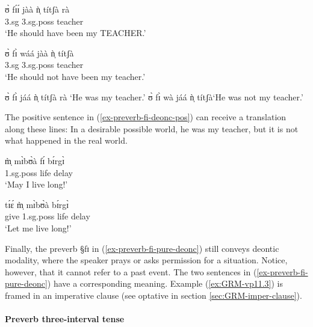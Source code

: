 \begin{exe} 
\ex\label{ex-preverb-fi-deonc}
\begin{xlist}
\ex\label{ex-preverb-fi-deonc-pos}
\gll ʊ̀ fɪ́ɪ́ jàà  ǹ̩ títʃà rà \\
  {\sc 3.sg}  {\mod}  {\ident}    {\sc 3.sg.poss}  teacher {\foc}  \\
\glt  `He should have been my TEACHER.' 

\ex
\gll    ʊ̀ fɪ̀ wáá jàà  ǹ̩ títʃà \\
        {\sc 3.sg} {\mod} {\neg} {\ident}    {\sc 3.sg.poss}  teacher   \\  
\glt   `He should not have been my teacher.'  


\ex
 ʊ̀  fɪ̀ jáá  ǹ̩ títʃà rà `He was my teacher.'
\ex
 ʊ̀  fɪ̀ wà jáá  ǹ̩ títʃà`He was not my teacher.'
\end{xlist}
\end{exe} 

The positive sentence in (\ref{ex-preverb-fi-deonc-pos}) can receive  a
translation along these lines:  In a desirable possible world, he was my
teacher, but it is not what happened in
the real world. 

\begin{exe} 
\ex\label{ex-preverb-fi-pure-deonc}
\begin{xlist}
\ex\label{ex:GRM-vp11.2}
\gll m̩̀ mɪ̀bʊ̀à fɪ́  bɪ́rgɪ̀ \\
    {\sc 1.sg.poss} life    {\mod}  delay    \\
\glt  `May I live long!' 

\ex\label{ex:GRM-vp11.3}
\gll tɪ́ɛ́ m̩̀ mɪ̀bʊ̀à bɪ́rgɪ̀ \\
      give {\sc 1.sg.poss} life delay  \\
\glt  `Let me live long!' 
\end{xlist}
\end{exe} 

Finally, the preverb {\S fɪ}  in (\ref{ex-preverb-fi-pure-deonc}) still conveys
 deontic modality, where the speaker prays or asks permission for a 
situation. Notice, however,  that it cannot refer to a past event. The two
sentences
in (\ref{ex-preverb-fi-pure-deonc}) have a corresponding meaning. Example
(\ref{ex:GRM-vp11.3}) is framed in an imperative clause (see optative in section
\ref{sec:GRM-imper-clause}). 


\paragraph{Preverb three-interval tense}
\label{sec:GRM-preverb-three-int-tense}

